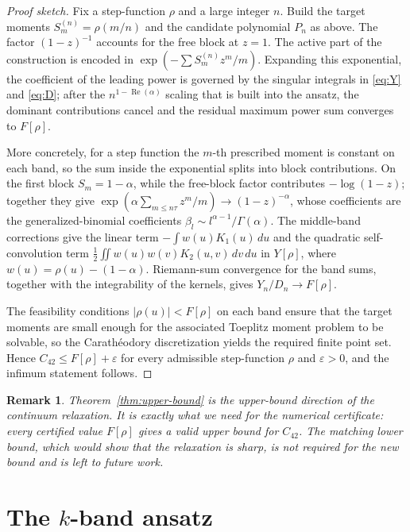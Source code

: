 \documentclass[11pt]{article}
\theoremstyle{plain}
\newtheorem{rem}[thm]{Remark}
\DeclareMathOperator{\Repart}{Re}
\begin{document}
\begin{proof}[Proof sketch]
Fix a step-function $\rho$ and a large integer $n$.  Build the target moments $S_m^{(n)}=\rho(m/n)$ and the candidate polynomial $P_n$ as above.  The factor $(1-z)^{-1}$ accounts for the free block at $z=1$.  The active part of the construction is encoded in $\exp(-\sum S_m^{(n)}z^m/m)$.  Expanding this exponential, the coefficient of the leading power is governed by the singular integrals in \eqref{eq:Y} and \eqref{eq:D}; after the $n^{1-\Repart(\alpha)}$ scaling that is built into the ansatz, the dominant contributions cancel and the residual maximum power sum converges to $F[\rho]$.

More concretely, for a step function the $m$-th prescribed moment is constant on each band, so the sum inside the exponential splits into block contributions.  On the first block $S_m=1-\alpha$, while the free-block factor contributes $-\log(1-z)$; together they give $\exp(\alpha\sum_{m\le n\tau}z^m/m)\to(1-z)^{-\alpha}$, whose coefficients are the generalized-binomial coefficients $\beta_l\sim l^{\alpha-1}/\Gamma(\alpha)$.  The middle-band corrections give the linear term $-\int w(u)K_1(u)\,du$ and the quadratic self-convolution term $\frac12\iint w(u)w(v)K_2(u,v)\,dv\,du$ in $Y[\rho]$, where $w(u)=\rho(u)-(1-\alpha)$.  Riemann-sum convergence for the band sums, together with the integrability of the kernels, gives $Y_n/D_n\to F[\rho]$.

The feasibility conditions $|\rho(u)|<F[\rho]$ on each band ensure that the target moments are small enough for the associated Toeplitz moment problem to be solvable, so the Carath\'{e}odory discretization yields the required finite point set.  Hence $C_{42}\le F[\rho]+\varepsilon$ for every admissible step-function $\rho$ and $\varepsilon>0$, and the infimum statement follows.
\end{proof}

\begin{rem}
Theorem~\ref{thm:upper-bound} is the \emph{upper-bound direction} of the continuum relaxation.  It is exactly what we need for the numerical certificate: every certified value $F[\rho]$ gives a valid upper bound for $C_{42}$.  The matching lower bound, which would show that the relaxation is sharp, is not required for the new bound and is left to future work.
\end{rem}

\section{The $k$-band ansatz}\label{sec:k-band}
\end{document}
